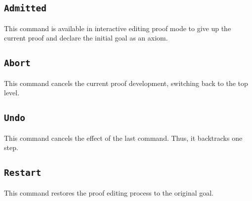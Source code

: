 \subsection{\tt Admitted}
This command is available in interactive editing proof mode to give up the current proof and declare the initial goal as an axiom.

\subsection{\tt Abort}
This command cancels the current proof development,
switching back to the top level.

\subsection{\tt Undo}
This command cancels the effect of the last command. Thus, it backtracks one step.

\subsection{\tt Restart}
This command restores the proof editing process to the original goal.

